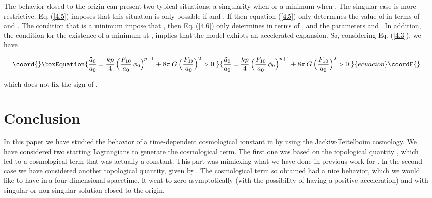 \documentclass[a4paper,twocolumn,prd,groupedaddress,nofootinbib,showpacs]
{revtex4}
\begin{document}
\medskip
The behavior closed to the origin can present two typical situations:
a singularity when \coordHE{} or a minimum when \coordHE{}. The singular
case is more restrictive. Eq. (\ref{4.5}) imposes that this situation
is only possible if \coordHE{} and \coordHE{}. If \coordHE{} then equation
(\ref{4.5}) only determines the value of \coordHE{} in terms of \coordHE{} and \coordHE{}. The condition that \coordHE{} is a minimum impose that
\coordHE{}, then Eq. (\ref{4.6}) only determines \myHighlight{$\ddot\phi$}\coordHE{} in
terms of \coordHE{}, \coordHE{} and the parameters \coordHE{} and \coordHE{}. In
addition, the condition for the existence of a minimum at \coordHE{},
implies that the model exhibts an accelerated expansion. So,
considering Eq. (\ref{4.3}), we have

\begin{equation}\coord{}\boxEquation{
\frac{\ddot a_0}{a_0}=\frac{kp}{4}\,
\Bigl(\frac{F_{10}}{a_0}\,\phi_0\Bigr)^{p+1}
+8\pi\,G\,\Bigl(\frac{F_{10}}{a_0}\Bigr)^2>0.
}{
\frac{\ddot a_0}{a_0}=\frac{kp}{4}\,
\Bigl(\frac{F_{10}}{a_0}\,\phi_0\Bigr)^{p+1}
+8\pi\,G\,\Bigl(\frac{F_{10}}{a_0}\Bigr)^2>0.
}{ecuacion}\coordE{}\end{equation}

\noindent
which does not fix the sign of \myHighlight{$\Lambda$}\coordHE{}.

\section{Conclusion}

In this paper we have studied the behavior of a time-dependent
cosmological constant in \coordHE{} by using the Jackiw-Teitelboim
cosmology. We have considered two starting Lagrangians to generate the
cosmological term. The first one was based on the topological quantity
\coordHE{}, which led to a
cosmological term that was actually a constant. This part was
mimicking what we have done in previous work for \coordHE{}. In the second
case we have considered another topological quantity, given by
\coordHE{}. The cosmological
term so obtained had a nice behavior, which we would like to have in a
four-dimensional spacetime. It went to zero asymptotically (with the
possibility of having a positive acceleration) and with singular or
non singular solution closed to the origin.
\end{document}
